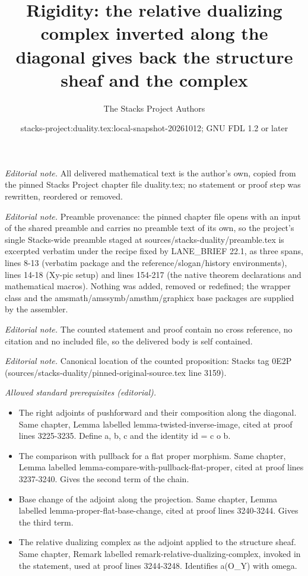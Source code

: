\documentclass[10pt,a4paper]{amsart}
\title{Rigidity: the relative dualizing complex inverted along the diagonal gives back the structure sheaf and the complex}
\author{The Stacks Project Authors}
\date{stacks-project:duality.tex:local-snapshot-20261012; GNU FDL 1.2 or later}
\theoremstyle{plain}
\theoremstyle{definition}
\theoremstyle{remark}
\numberwithin{equation}{subsection}
\begin{document}
\maketitle
\noindent\textit{Editorial note.} All delivered mathematical text is the author's own, copied from the pinned Stacks Project chapter file duality.tex; no statement or proof step was rewritten, reordered or removed.\par\medskip
\noindent\textit{Editorial note.} Preamble provenance: the pinned chapter file opens with an input of the shared preamble and carries no preamble text of its own, so the project's single Stacks-wide preamble staged at sources/stacks-duality/preamble.tex is excerpted verbatim under the recipe fixed by LANE\_BRIEF 22.1, as three spans, lines 8-13 (verbatim package and the reference/slogan/history environments), lines 14-18 (Xy-pic setup) and lines 154-217 (the native theorem declarations and mathematical macros). Nothing was added, removed or redefined; the wrapper class and the amsmath/amssymb/amsthm/graphicx base packages are supplied by the assembler.\par\medskip
\noindent\textit{Editorial note.} The counted statement and proof contain no cross reference, no citation and no included file, so the delivered body is self contained.\par\medskip
\noindent\textit{Editorial note.} Canonical location of the counted proposition: Stacks tag 0E2P (sources/stacks-duality/pinned-original-source.tex line 3159).\par\medskip
\noindent\textit{Allowed standard prerequisites (editorial).}\begin{itemize}
\item The right adjoints of pushforward and their composition along the diagonal. Same chapter, Lemma labelled lemma-twisted-inverse-image, cited at proof lines 3225-3235. Define a, b, c and the identity id = c o b.
\item The comparison with pullback for a flat proper morphism. Same chapter, Lemma labelled lemma-compare-with-pullback-flat-proper, cited at proof lines 3237-3240. Gives the second term of the chain.
\item Base change of the adjoint along the projection. Same chapter, Lemma labelled lemma-proper-flat-base-change, cited at proof lines 3240-3244. Gives the third term.
\item The relative dualizing complex as the adjoint applied to the structure sheaf. Same chapter, Remark labelled remark-relative-dualizing-complex, invoked in the statement, used at proof lines 3244-3248. Identifies a(O\_Y) with omega.
\end{itemize}\medskip
\end{document}

